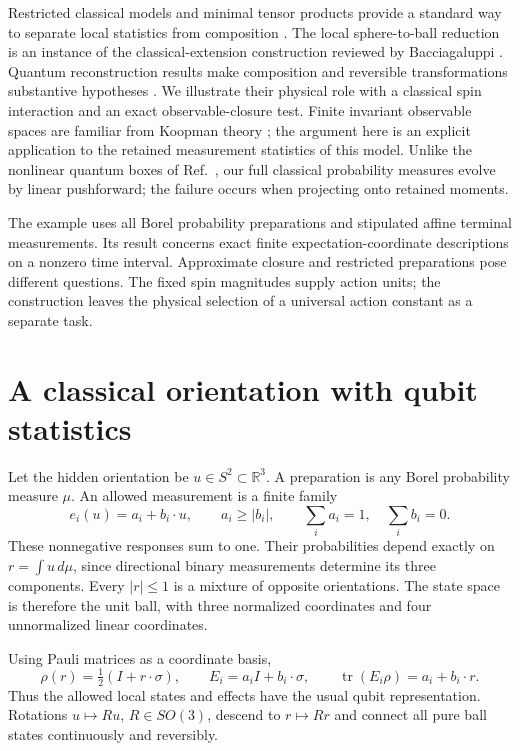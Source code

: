 \documentclass[11pt,a4paper]{article}
\newcommand{\R}{\mathbb R}
\begin{document}
Restricted classical models and minimal tensor products provide a standard
way to separate local statistics from composition \cite{janotta}. The local
sphere-to-ball reduction is an instance of the classical-extension construction
reviewed by Bacciagaluppi \cite{bacciagaluppi}. Quantum
reconstruction results make composition and reversible transformations
substantive hypotheses \cite{hardy,cdp,torre}. We illustrate their physical
role with a classical spin interaction and an exact observable-closure test.
Finite invariant observable spaces are familiar from Koopman theory
\cite{brunton}; the argument here is an explicit application to the retained
measurement statistics of this model. Unlike the nonlinear quantum boxes of
Ref.~\cite{preparation}, our full classical probability measures evolve by
linear pushforward; the failure occurs when projecting onto retained moments.

The example uses all Borel probability preparations and stipulated affine
terminal measurements. Its result concerns exact finite expectation-coordinate
descriptions on a nonzero time interval. Approximate closure and restricted
preparations pose different questions. The fixed spin magnitudes supply action
units; the construction leaves the physical selection of a universal action
constant as a separate task.

\section{A classical orientation with qubit statistics}
Let the hidden orientation be $u\in S^2\subset\R^3$. A preparation is any
Borel probability measure $\mu$. An allowed measurement is a finite family
\begin{equation}
 e_i(u)=a_i+b_i\cdot u,\qquad a_i\ge |b_i|,\qquad
 \sum_i a_i=1,\quad\sum_i b_i=0.
\end{equation}
These nonnegative responses sum to one. Their probabilities depend exactly
on $r=\int u\,d\mu$, since directional binary measurements determine its
three components. Every $|r|\le1$ is a mixture of opposite orientations.
The state space is therefore the unit ball, with three normalized coordinates
and four unnormalized linear coordinates.

Using Pauli matrices as a coordinate basis,
\begin{equation}
 \rho(r)=\tfrac12(I+r\cdot\sigma),\qquad E_i=a_iI+b_i\cdot\sigma,
 \qquad \operatorname{tr}(E_i\rho)=a_i+b_i\cdot r.
\end{equation}
Thus the allowed local states and effects have the usual qubit representation.
Rotations $u\mapsto Ru$, $R\in SO(3)$, descend to $r\mapsto Rr$ and
connect all pure ball states continuously and reversibly.
\end{document}
